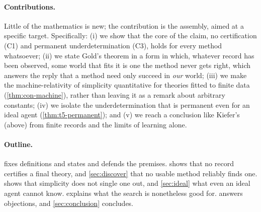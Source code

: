 \paragraph{Contributions.}
Little of the mathematics is new; the contribution is the assembly, aimed at a specific
target. Specifically:
(i) we show that the core of the claim, no certification (C1) and permanent
underdetermination (C3), holds for every method whatsoever;
(ii) we state Gold's theorem in a form in which, whatever record has been observed, some
world that fits it is one the method never gets right, which answers the reply that a
method need only succeed in \emph{our} world;
(iii) we make the machine-relativity of simplicity quantitative for theories fitted to
finite data (\cref{thm:con-machine}), rather than leaving it as a remark about arbitrary
constants;
(iv) we isolate the underdetermination that is permanent even for an ideal agent
(\cref{thm:t5-permanent}); and
(v) we reach a conclusion like Kiefer's (above) from finite records and the limits of
learning alone.

\paragraph{Outline.}
 fixes definitions and states and defends the premises.
 shows that no record certifies a final theory, and
\cref{sec:discover} that no usable method reliably finds one.
 shows that simplicity does not single one out, and
\cref{sec:ideal} what even an ideal agent cannot know.
 explains what the search is nonetheless good for.
 answers objections, and \cref{sec:conclusion} concludes.
